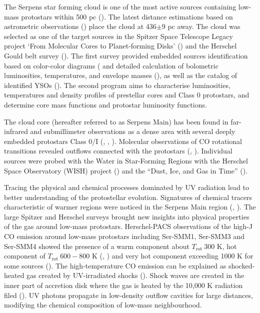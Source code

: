 \documentclass{aa}
\begin{document}
The Serpens star forming cloud is one of the most active sources containing low-mass protostars within 500 pc (\citealt{Eva09}). The latest distance estimations based on astrometric observations (\citealt{Ort17}) place the cloud at 436$\pm$9 pc away. The cloud was selected as one of the target sources in the Spitzer Space Telescope Legacy project ‘From Molecular Cores to Planet-forming Disks’ (\citealt{Eva03}) and the Herschel Gould belt survey (\citealt{And10}). The first survey provided embedded sources identification based on color-color diagrams (\citealt{Har07} and detailed calculation of bolometric luminosities, temperatures, and envelope masses (\citealt{Eno09}), as well as the catalog of  identified YSOs (\citealt{Dun15}). The second program aims to characterise luminosities, temperatures and density profiles of prestellar cores and Class 0 protostars, and determine core mass functions and protostar luminosity functions.

The cloud core (hereafter referred to as Serpens Main) has been found in far-infrared and submillimeter observations as a dense area with several deeply embedded protostars Class 0/I (\citealt{Cas93}, \citealt{Hur96}, \citealt{Tes98}). Molecular observations of CO rotational transitions revealed outflows connected with the protostars (\citealt{Dav99}, \citealt{Dio10}). Individual sources were probed with the Water in Star-Forming Regions with the Herschel Space Observatory (WISH) project (\citealt{vDi11}) and the “Dust, Ice, and Gas in Time” (\citealt{Gre13}).  

Tracing the physical and chemical processes dominated by UV radiation lead to better understanding of the protostellar evolution. Signatures of chemical tracers characteristic of warmer regions were noticed in the Serpens Main region (\citealt{MMu00}, \citealt{Yil15}). The large Spitzer and Herschel surveys brought new insights into physical properties of the gas around low-mass protostars. Herschel-PACS observations of the high-J CO emission around low-mass protostars including Ser-SMM1, Ser-SMM3 and Ser-SMM4 showed the presence of a warm component about $T_\mathrm{rot} ~ 300$ K, hot component of $T_\mathrm{rot} ~ 600-800$ K (\citealt{Kar13}, \citealt{Gre13}) and very hot component exceeding 1000 K for some sources (\citealt{Man13}). The high-temperature CO emission can be explained as shocked-heated gas created by UV-irradiated shocks (\citealt{Kri17}). Shock waves are created in the inner part of accretion disk where the gas is heated by the 10,000 K radiation filed (\citealt{Spa95}). UV photons propagate in low-density outflow cavities for large distances, modifying the chemical composition of low-mass neighbourhood. 
\end{document}
